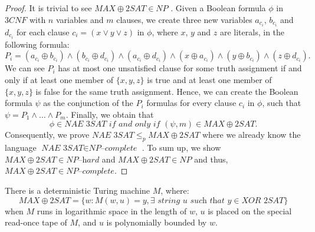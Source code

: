\documentclass[a4paper,UKenglish,cleveref, autoref]{lipics-v2019}
\begin{document}
\begin{proof}
It is trivial to see $MAX\oplus2SAT \in NP$ \cite{Pap03}. Given a Boolean formula $\phi$ in $3CNF$ with $n$ variables and $m$ clauses, we create three new variables $a_{c_{i}}$, $b_{c_{i}}$ and $d_{c_{i}}$ for each clause $c_{i} = (x \vee y \vee z)$ in $\phi$, where $x$, $y$ and $z$ are literals, in the following formula:
\[P_{i} = (a_{c_{i}} \oplus b_{c_{i}}) \wedge (b_{c_{i}} \oplus d_{c_{i}}) \wedge (a_{c_{i}} \oplus d_{c_{i}}) \wedge (x \oplus a_{c_{i}}) \wedge (y \oplus b_{c_{i}}) \wedge (z \oplus d_{c_{i}}).\]
We can see $P_{i}$ has at most one unsatisfied clause for some truth assignment if and only if at least one member of $\{x,y,z\}$ is true and at least one member of $\{x,y,z\}$ is false for the same truth assignment. Hence, we can create the Boolean formula $\psi$ as the conjunction of the $P_{i}$ formulas for every clause $c_{i}$ in $\phi$, such that $\psi = P_{1} \wedge \ldots \wedge P_{m}$. Finally, we obtain that
\[\phi \in \textit{NAE 3SAT} \textit{ if and only if } (\psi, m) \in MAX\oplus2SAT.\]
Consequently, we prove $\textit{NAE 3SAT} \leq_{p} MAX\oplus2SAT$ where we already know the language $\textit{NAE 3SAT} \in \textit{NP--complete}$ \cite{GJ79}. To sum up, we show $MAX\oplus2SAT \in \textit{NP--hard}$ and $MAX\oplus2SAT \in NP$ and thus, $MAX\oplus2SAT \in \textit{NP--complete}$.
\end{proof}

\begin{theorem}
\label{proof}
There is a deterministic Turing machine $M$, where:
\[MAX\oplus2SAT = \{w: M(w, u) = y, \exists \textit{ string } u \textit{ such that } y \in \textit{XOR 2SAT}\}\]
when $M$ runs in logarithmic space in the length of $w$, $u$ is placed on the special read-once tape of $M$, and $u$ is polynomially bounded by $w$.
\end{theorem}
\end{document}
